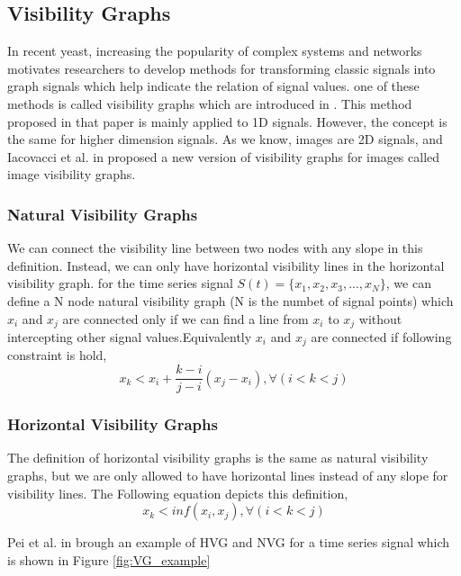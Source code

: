 \documentclass[conference]{IEEEtran}
\begin{document}
\subsection{\textbf{Visibility Graphs}}


In recent yeast, increasing the popularity of complex systems and networks motivates researchers to develop methods for transforming classic signals into graph signals which help indicate the relation of signal values. one of these methods is called visibility graphs which are introduced in \cite{VG}. This method proposed in that paper is mainly applied to 1D signals. However, the concept is the same for higher dimension signals. As we know, images are 2D signals, and Iacovacci et al. in \cite{IVG} proposed a new version of visibility graphs for images called image visibility graphs.



\subsubsection{Natural Visibility Graphs}
We can connect the visibility line between two nodes with any slope in this definition. Instead, we can only have horizontal visibility lines in the horizontal visibility graph.
for the time series signal $S(t)=\{x_1,x_2,x_3,...,x_N\}$, we can define a N node natural visibility graph (N is the numbet of signal points) which $x_i$ and $x_j$ are connected only if we can find a line from $x_i$ to $x_j$ without intercepting other signal values.Equivalently $x_i$ and $x_j$ are connected if following constraint is hold,
\begin{equation}
x_k < x_i +\frac{k-i}{j-i}(x_j-x_i), \forall(i<k<j)
\end{equation}





\subsubsection{Horizontal Visibility Graphs}

The definition of horizontal visibility graphs is the same as natural visibility graphs, but we are only allowed to have horizontal lines instead of any slope for visibility lines. The  Following equation depicts this definition,
\begin{equation}
x_k < inf(x_i, x_j), \forall(i<k<j)
\end{equation}

Pei et al. in \cite{china_HVG} brough an example of HVG and NVG for a time series signal which is shown in Figure \ref{fig:VG_example}
\end{document}
